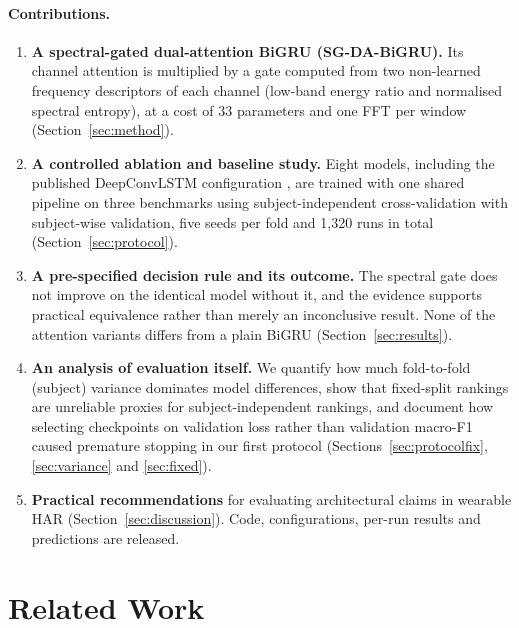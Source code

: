 \documentclass[11pt,a4paper]{article}
\begin{document}
\paragraph{Contributions.}
\begin{enumerate}
  \item \textbf{A spectral-gated dual-attention BiGRU (SG-DA-BiGRU).} Its channel attention is multiplied by a gate computed from two non-learned frequency descriptors of each channel (low-band energy ratio and normalised spectral entropy), at a cost of 33 parameters and one FFT per window (Section~\ref{sec:method}).
  \item \textbf{A controlled ablation and baseline study.} Eight models, including the published DeepConvLSTM configuration \cite{ordonez2016deep}, are trained with one shared pipeline on three benchmarks using subject-independent cross-validation with subject-wise validation, five seeds per fold and 1{,}320 runs in total (Section~\ref{sec:protocol}).
  \item \textbf{A pre-specified decision rule and its outcome.} The spectral gate does not improve on the identical model without it, and the evidence supports practical equivalence rather than merely an inconclusive result. None of the attention variants differs from a plain BiGRU (Section~\ref{sec:results}).
  \item \textbf{An analysis of evaluation itself.} We quantify how much fold-to-fold (subject) variance dominates model differences, show that fixed-split rankings are unreliable proxies for subject-independent rankings, and document how selecting checkpoints on validation loss rather than validation macro-F1 caused premature stopping in our first protocol (Sections~\ref{sec:protocolfix}, \ref{sec:variance} and \ref{sec:fixed}).
  \item \textbf{Practical recommendations} for evaluating architectural claims in wearable HAR (Section~\ref{sec:discussion}). Code, configurations, per-run results and predictions are released.
\end{enumerate}

\section{Related Work}
\label{sec:related}
\end{document}
